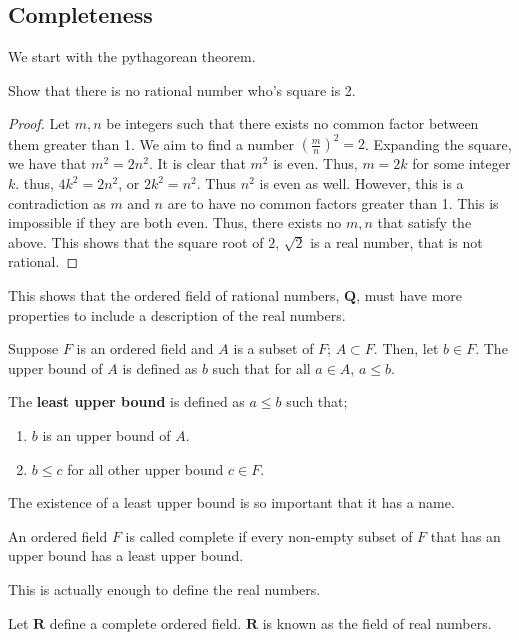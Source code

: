 \subsection{Completeness}

We start with the pythagorean theorem.
\begin{problem}
    Show that there is no rational number who's square is 2.
\end{problem}
\begin{proof}
    Let $m, n$ be integers such that there exists no common factor between them greater than 1. We aim to find a number $\left(\frac{m}{n}\right)^2 = 2$. Expanding the square, we have that $m^2 = 2 n^2$. It is clear that $m^2$ is even. Thus, $m=2k$ for some integer $k$. thus, $4k^2 = 2n^2$, or $2k^2 = n^2$. Thus $n^2$ is even as well. However, this is a contradiction as $m$ and $n$ are to have no common factors greater than 1. This is impossible if they are both even. Thus, there exists no $m,n$ that satisfy the above. This shows that the square root of $2$, $\sqrt{2}$ is a real number, that is not rational. 
\end{proof}
This shows that the ordered field of rational numbers, $\mathbf{Q}$, must have more properties to include a description of the real numbers.

\begin{definition}
    Suppose $F$ is an ordered field and $A$ is a subset of $F$; $A \subset F$. Then, let $b\in F$. The upper bound of $A$ is defined as $b$ such that for all $a \in A$, $a \leq b$. 

    The \textbf{least upper bound} is defined as $a \leq b$ such that;
    \begin{enumerate}
        \item $b$ is an upper bound of $A$.
        \item $b \leq c$ for all other upper bound $c \in F$.
    \end{enumerate}
\end{definition}

The existence of a least upper bound is so important that it has a name.
\begin{definition}
    An ordered field $F$ is called complete if every non-empty subset of $F$ that has an upper bound has a least upper bound.
\end{definition}

This is actually enough to define the real numbers.

\begin{definition}
    Let $\mathbf{R}$ define a complete ordered field. $\mathbf{R}$ is known as the field of real numbers.
\end{definition}

